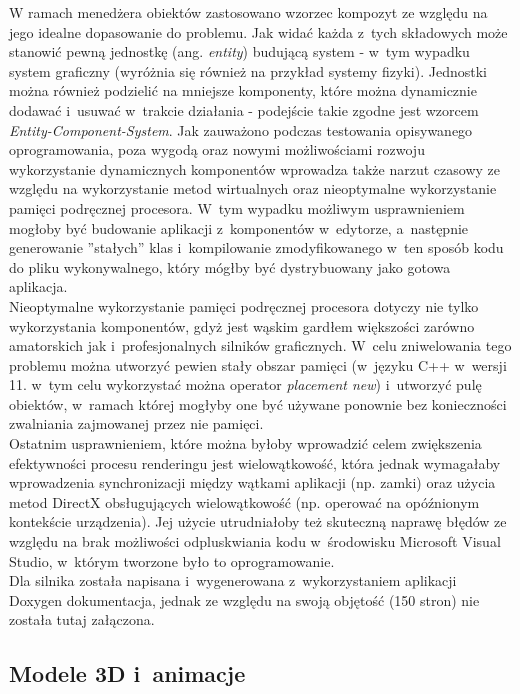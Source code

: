 W ramach menedżera obiektów zastosowano wzorzec kompozyt ze względu na jego idealne dopasowanie do problemu.
Jak widać każda z~tych składowych może stanowić pewną jednostkę (ang. \emph{entity}) budującą system - w~tym wypadku system graficzny (wyróżnia się również na przykład systemy fizyki). Jednostki można również podzielić na mniejsze komponenty, które można dynamicznie dodawać i~usuwać w~trakcie działania - podejście takie zgodne jest wzorcem \emph{Entity-Component-System}. Jak zauważono podczas testowania opisywanego oprogramowania, poza wygodą oraz nowymi możliwościami rozwoju wykorzystanie dynamicznych komponentów wprowadza także narzut czasowy ze względu na wykorzystanie metod wirtualnych oraz nieoptymalne wykorzystanie pamięci podręcznej procesora. W~tym wypadku możliwym usprawnieniem mogłoby być budowanie aplikacji z~komponentów w~edytorze, a~następnie generowanie ''stałych'' klas i~kompilowanie zmodyfikowanego w~ten sposób kodu do pliku wykonywalnego, który mógłby być dystrybuowany jako gotowa aplikacja.\\
Nieoptymalne wykorzystanie pamięci podręcznej procesora dotyczy nie tylko wykorzystania komponentów, gdyż jest wąskim gardłem większości zarówno amatorskich jak i~profesjonalnych silników graficznych. W~celu zniwelowania tego problemu można utworzyć pewien stały obszar pamięci (w~języku C++ w~wersji 11. w~tym celu wykorzystać można operator \emph{placement new}) i~utworzyć pulę obiektów, w~ramach której mogłyby one być używane ponownie bez konieczności zwalniania zajmowanej przez nie pamięci.\\
Ostatnim usprawnieniem, które można byłoby wprowadzić celem zwiększenia efektywności procesu renderingu jest wielowątkowość, która jednak wymagałaby wprowadzenia synchronizacji między wątkami aplikacji (np. zamki) oraz użycia metod DirectX obsługujących wielowątkowość (np. operować na opóźnionym kontekście urządzenia). Jej użycie utrudniałoby też skuteczną naprawę błędów ze względu na brak możliwości odpluskwiania kodu w~środowisku Microsoft Visual Studio, w~którym tworzone było to oprogramowanie.\\
Dla silnika została napisana i~wygenerowana z~wykorzystaniem aplikacji Doxygen dokumentacja, jednak ze względu na swoją objętość (150 stron) nie została tutaj załączona.

\subsection{Modele 3D i~animacje}

